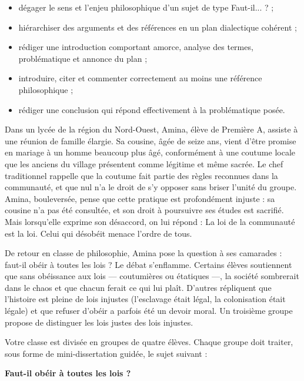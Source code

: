 \documentclass[11pt]{article}
\newcounter{popsec}
\newcounter{popsub}
\newcommand{\courssub}[1]{%
  \stepcounter{popsub}%
  \par\vspace{9pt}\noindent{\popxbold\fontsize{11.5}{13}\selectfont\color{popink}{\color{poporange}\thepopsec.\thepopsub}\hspace{6pt}#1}\par\nopagebreak\vspace{4pt}
}
\begin{document}
\begin{itemize}
\item dégager le sens et l'enjeu philosophique d'un sujet de type \guillemotleft Faut-il... ? \guillemotright ;
\item hiérarchiser des arguments et des références en un plan dialectique cohérent ;
\item rédiger une introduction comportant amorce, analyse des termes, problématique et annonce du plan ;
\item introduire, citer et commenter correctement au moins une référence philosophique ;
\item rédiger une conclusion qui répond effectivement à la problématique posée.
\end{itemize}

\courssub{Situation}

Dans un lycée de la région du Nord-Ouest, Amina, élève de Première A, assiste à une réunion de famille élargie. Sa cousine, âgée de seize ans, vient d'être promise en mariage à un homme beaucoup plus âgé, conformément à une coutume locale que les anciens du village présentent comme légitime et même sacrée. Le chef traditionnel rappelle que la coutume fait partie des règles reconnues dans la communauté, et que nul n'a le droit de s'y opposer sans briser l'unité du groupe. Amina, bouleversée, pense que cette pratique est profondément injuste : sa cousine n'a pas été consultée, et son droit à poursuivre ses études est sacrifié. Mais lorsqu'elle exprime son désaccord, on lui répond : \guillemotleft La loi de la communauté est la loi. Celui qui désobéit menace l'ordre de tous. \guillemotright

De retour en classe de philosophie, Amina pose la question à ses camarades : faut-il obéir à toutes les lois ? Le débat s'enflamme. Certains élèves soutiennent que sans obéissance aux lois — coutumières ou étatiques —, la société sombrerait dans le chaos et que chacun ferait ce qui lui plaît. D'autres répliquent que l'histoire est pleine de lois injustes (l'esclavage était légal, la colonisation était légale) et que refuser d'obéir a parfois été un devoir moral. Un troisième groupe propose de distinguer les lois justes des lois injustes.

Votre classe est divisée en groupes de quatre élèves. Chaque groupe doit traiter, sous forme de mini-dissertation guidée, le sujet suivant :

\begin{center}
\textbf{\guillemotleft Faut-il obéir à toutes les lois ? \guillemotright}
\end{center}
\end{document}

